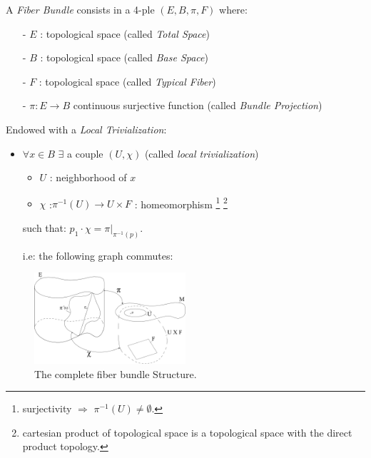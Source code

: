 \documentclass[a4paper,12pt]{scrartcl}    %
\begin{document}
\begin{definition}\label{Def:FiberBundle}
A \emph{Fiber Bundle} consists in a 4-ple $(E,B,\pi,F)$ where:
\begin{itemize}
\item[-] $E$ : topological space (called \emph{Total Space})
\item[-] $B$ : topological space (called \emph{Base Space})
\item[-] $F$ : topological space (called \emph{Typical Fiber})
\item[-] $\pi : E \rightarrow B $ continuous surjective function (called \emph{Bundle Projection})
\end{itemize}
Endowed with a \emph{Local Trivialization}:
\begin{itemize}
\item $\forall x \in B$ $\exists$ a couple $(U, \chi)$ (called \emph{local trivialization})
\begin{itemize}
\item $U$ : neighborhood of $x$
\item $\chi$ :$\pi^{-1}(U) \rightarrow U \times F$ : homeomorphism
 \footnote{surjectivity $\Rightarrow$ $\pi^{-1}(U) \neq \emptyset$.} 
 \footnote{cartesian product of topological space is a topological space with the direct product topology.}
\end{itemize}
such that: $p_1 \cdot \chi = \pi \vert_{\pi^{-1}(p)}$.

i.e: the following graph commutes:


\end{itemize}
\end{definition}

\begin{figure}[h!]
  \caption{The complete fiber bundle Structure.}
  	\includegraphics[width=0.5\textwidth]{Pictures/FiberBundle}
  \centering
\end{figure}
\end{document}
